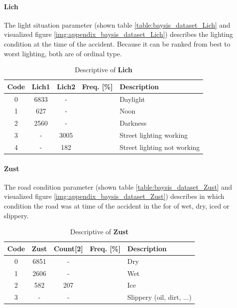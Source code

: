 \paragraph{Lich}
\label{baysis_dataset_Lich}
The light situation parameter (shown table \autoref{table:baysis_dataset_Lich} and visualized figure \autoref{img:appendix_baysis_dataset_Lich}) describes the lighting condition at the time of the accident. Because it can be ranked from best to worst lighting, both are of ordinal type.
\begin{table}[ht]
	\centering
	\small
	\begin{tabular}{c|c|c|c|l}
		\toprule
		Code & \textbf{Lich1} & \textbf{Lich2} & Freq. [\%] & Description \\ 
		\midrule 
		0 & 6833 	& - 	& & Daylight \\
		1 & 627 	& -		& & Noon \\
		2 & 2560	& - 	& & Darkness \\
		3 & - 		& 3005	& & Street lighting working \\
		4 & - 		& 182	& & Street lighting not working \\
		\bottomrule
	\end{tabular}
	\caption{Descriptive of \textbf{Lich}}
	\label{table:baysis_dataset_Lich}
	\vspace{-8mm}
\end{table} 

\paragraph{Zust}
\label{baysis_dataset_Zust}
The road condition parameter (shown table \autoref{table:baysis_dataset_Zust} and visualized figure \autoref{img:appendix_baysis_dataset_Zust}) describes in which condition the road was at time of the accident in the for of wet, dry, iced or slippery.
\begin{table}[ht]
	\centering
	\small
	\begin{tabular}{c|c|c|c|l}
		\toprule
		Code & \textbf{Zust} & Count[2] & Freq. [\%] & Description \\ 
		\midrule 
		0 & 6851 	& -		& & Dry \\ 
 		1 & 2606	& -		& & Wet \\ 
 		2 & 582		& 207	& & Ice \\
 		3 & - 		& -		& & Slippery (oil, dirt, ...)  \\
	\end{tabular}
	\caption{Descriptive of \textbf{Zust}}
	\label{table:baysis_dataset_Zust}
	\vspace{-8mm}
\end{table}

